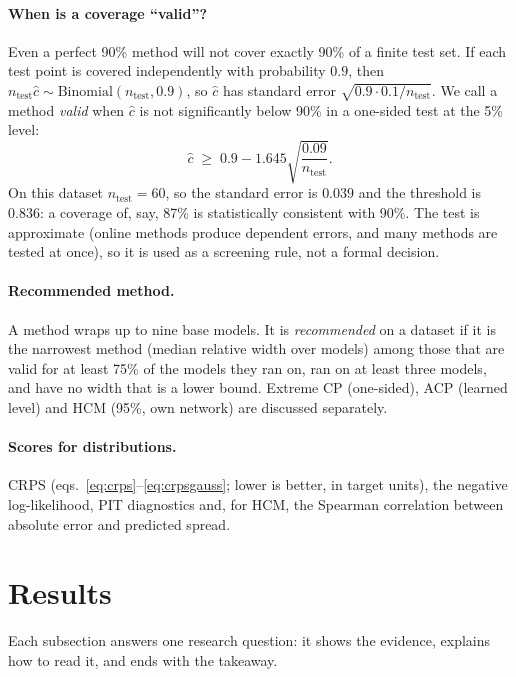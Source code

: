 \documentclass[11pt]{article}
\begin{document}
\paragraph{When is a coverage ``valid''?} Even a perfect 90\% method will not cover exactly 90\% of a finite test set. If each test
point is covered independently with probability $0.9$, then $n_{\text{test}}\hat c\sim\mathrm{Binomial}(n_{\text{test}},0.9)$, so
$\hat c$ has standard error $\sqrt{0.9\cdot0.1/n_{\text{test}}}$. We call a method \emph{valid} when $\hat c$ is not significantly
below 90\% in a one-sided test at the 5\% level:
\begin{equation}\label{eq:valid}
\hat c\;\ge\;0.9-1.645\sqrt{\frac{0.09}{n_{\text{test}}}} .
\end{equation}
On this dataset $n_{\text{test}}=60$, so the standard error is $0.039$ and the threshold is
$0.836$: a coverage of, say, 87\% is statistically consistent with 90\%.
The test is approximate (online methods produce dependent errors, and many methods are tested at once), so it is used as a
screening rule, not a formal decision.

\paragraph{Recommended method.} A method wraps up to nine base models. It is \emph{recommended} on a dataset if it is the
narrowest method (median relative width over models) among those that are valid for at least 75\% of the models they ran on,
ran on at least three models, and have no width that is a lower bound. Extreme CP (one-sided), ACP (learned level) and HCM (95\%,
own network) are discussed separately.

\paragraph{Scores for distributions.} CRPS (eqs.~\ref{eq:crps}--\ref{eq:crpsgauss}; lower is better, in target units), the negative
log-likelihood, PIT diagnostics and, for HCM, the Spearman correlation between absolute error and predicted spread.

\section{Results}\label{sec:results}
Each subsection answers one research question: it shows the evidence, explains how to read it, and ends with the takeaway.
\end{document}
